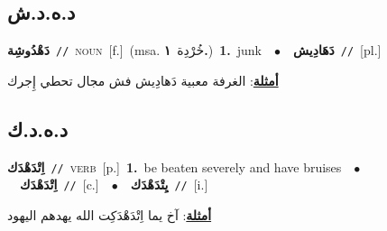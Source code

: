 \documentclass[10pt,a4paper,twoside]{article} %
\begin{document}
\begin{multicols}{2}
\vspace{-3mm}
\subsection*{\color{blue}\foreignlanguage{arabic}{د.ه.د.ش}\color{blue}{}} 

{\setlength\topsep{0pt}\textbf{\foreignlanguage{arabic}{دَهْدُوشِة}}\ {\color{gray}\texttt{//}\color{black}}\ \textsc{noun}\ [f.]\ \color{gray}(msa. \foreignlanguage{arabic}{خُرْدِة}~\foreignlanguage{arabic}{\textbf{١.}})\color{black}\ \textbf{1.}~junk\ \ $\bullet$\ \ \setlength\topsep{0pt}\textbf{\foreignlanguage{arabic}{دَهَادِيش}}\ {\color{gray}\texttt{//}\color{black}}\ [pl.]\  \begin{flushright}\color{gray}\foreignlanguage{arabic}{\textbf{\underline{\foreignlanguage{arabic}{أمثلة}}}: الغرفة معبية دَهادِيش فش مجال تحطي إِجرك}\end{flushright}\color{black}} \vspace{2mm}

\vspace{-3mm}
\subsection*{\color{blue}\foreignlanguage{arabic}{د.ه.د.ك}\color{blue}{}} 

{\setlength\topsep{0pt}\textbf{\foreignlanguage{arabic}{اِتْدَهْدَك}}\ {\color{gray}\texttt{//}\color{black}}\ \textsc{verb}\ [p.]\ \textbf{1.}~be beaten severely and have bruises\ \ $\bullet$\ \ \setlength\topsep{0pt}\textbf{\foreignlanguage{arabic}{اِتْدَهْدَك}}\ {\color{gray}\texttt{//}\color{black}}\ [c.]\ \ $\bullet$\ \ \setlength\topsep{0pt}\textbf{\foreignlanguage{arabic}{يِتْدَهْدَك}}\ {\color{gray}\texttt{//}\color{black}}\ [i.]\  \begin{flushright}\color{gray}\foreignlanguage{arabic}{\textbf{\underline{\foreignlanguage{arabic}{أمثلة}}}: آخ يما اِتْدَهْدَكِت الله يهدهم اليهود}\end{flushright}\color{black}} \vspace{2mm}


\end{multicols}
\end{document}
